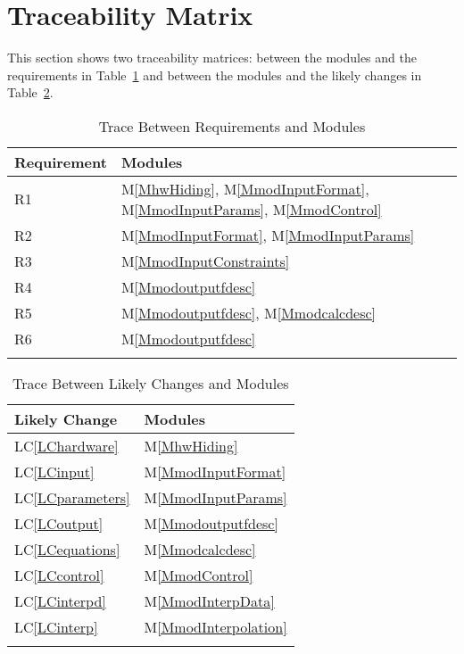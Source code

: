 \documentclass[12pt]{article}
\begin{document}
\section{Traceability Matrix}
\label{Sec:TracMatr}
This section shows two traceability matrices: between the modules and the requirements in Table~\ref{Table:TracBetwRequandModu} and between the modules and the likely changes in Table~\ref{Table:TracBetwLikeChanandModu}.
\begin{longtable}{l l}
\toprule
Requirement & Modules
\\
\midrule
R1 & M\ref{MhwHiding}, M\ref{MmodInputFormat}, M\ref{MmodInputParams}, M\ref{MmodControl}
\\
R2 & M\ref{MmodInputFormat}, M\ref{MmodInputParams}
\\
R3 & M\ref{MmodInputConstraints}
\\
R4 & M\ref{Mmodoutputfdesc}
\\
R5 & M\ref{Mmodoutputfdesc}, M\ref{Mmodcalcdesc}
\\
R6 & M\ref{Mmodoutputfdesc}
\\
\bottomrule
\caption{Trace Between Requirements and Modules}
\label{Table:TracBetwRequandModu}
\end{longtable}
\begin{longtable}{l l}
\toprule
Likely Change & Modules
\\
\midrule
LC\ref{LChardware} & M\ref{MhwHiding}
\\
LC\ref{LCinput} & M\ref{MmodInputFormat}
\\
LC\ref{LCparameters} & M\ref{MmodInputParams}
\\
LC\ref{LCoutput} & M\ref{Mmodoutputfdesc}
\\
LC\ref{LCequations} & M\ref{Mmodcalcdesc}
\\
LC\ref{LCcontrol} & M\ref{MmodControl}
\\
LC\ref{LCinterpd} & M\ref{MmodInterpData}
\\
LC\ref{LCinterp} & M\ref{MmodInterpolation}
\\
\bottomrule
\caption{Trace Between Likely Changes and Modules}
\label{Table:TracBetwLikeChanandModu}
\end{longtable}
\end{document}
